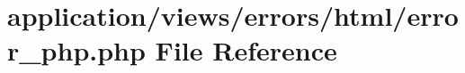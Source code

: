 \hypertarget{html_2error__php_8php}{}\section{application/views/errors/html/error\+\_\+php.php File Reference}
\label{html_2error__php_8php}
